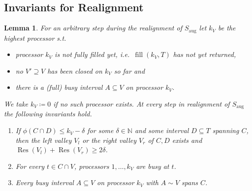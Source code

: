 \documentclass[a4paper]{article}
\DeclareMathOperator{\aug}{aug}
\DeclareMathOperator{\fillop}{fill}
\DeclareMathOperator{\res}{Res}
\newtheorem{lemma}[theorem]{Lemma}
\begin{document}
\subsection{Invariants for Realignment}
\begin{lemma}\label{lemma:invariant}
  For an arbitrary step during the realignment of $S_{\aug}$ let $k_V$ be the highest processor s.t.\
  \begin{itemize}
    \item
      processor $k_V$ is not fully filled yet, i.e.\ $\fillop(k_V, T)$ has not yet returned,
    \item
      no $V' \supseteq V$ has been closed on $k_V$ so far and
    \item
      there is a (full) busy interval $A \subseteq V$ on processor $k_V$.
  \end{itemize}
  We take $k_V \coloneqq 0$ if no such processor exists.
  At every step in realignment of $S_{\aug}$ the following invariants hold.
  \begin{enumerate}
    \item
      If $\phi(C \cap D) \leq k_V - \delta$ for some $\delta \in \mathbb{N}$ and some interval $D \subseteq T$ spanning $C$, then the left valley $V_l$ or the right valley $V_r$ of $C, D$ exists and $\res(V_l) + \res(V_r) \geq 2 \delta$.
    \item
      For every $t \in C \cap V$, processors $1, \ldots, k_V$ are busy at $t$.
    \item
      Every busy interval $A \subseteq V$ on processor $k_V$ with $A \sim V$ spans $C$.
  \end{enumerate}
\end{lemma}
\end{document}
